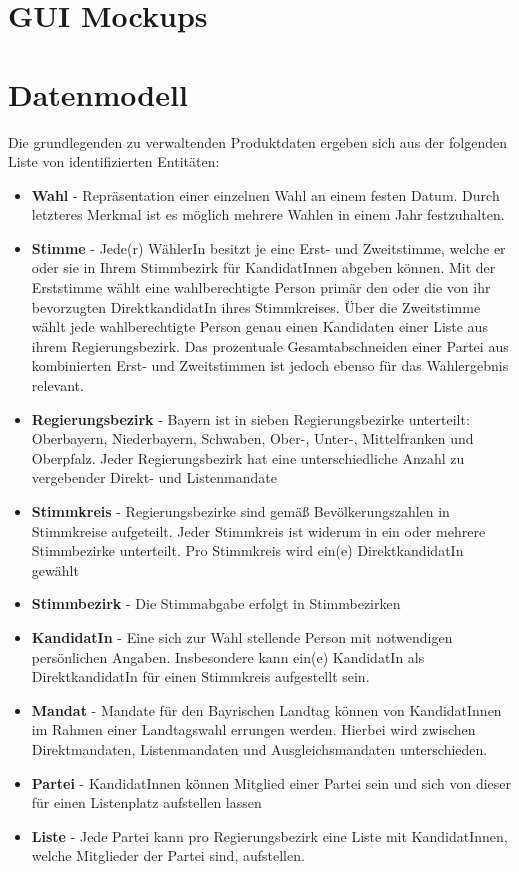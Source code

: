 \documentclass[a4paper,12pt]{article}
\begin{document}
\section{GUI Mockups}

\section{Datenmodell}
Die grundlegenden zu verwaltenden Produktdaten ergeben sich aus der folgenden Liste von
identifizierten Entitäten:
\begin{itemize}
  \item \textbf{Wahl} - Repräsentation einer einzelnen Wahl an einem festen Datum. 
        Durch letzteres Merkmal ist es möglich mehrere Wahlen in einem Jahr festzuhalten.
  \item \textbf{Stimme} - Jede(r) WählerIn besitzt je eine Erst- und Zweitstimme, welche er oder sie in Ihrem
        Stimmbezirk für KandidatInnen abgeben können. Mit der Erststimme wählt eine wahlberechtigte Person
        primär den oder die von ihr bevorzugten DirektkandidatIn ihres Stimmkreises. Über die Zweitstimme wählt 
        jede wahlberechtigte Person genau einen Kandidaten einer Liste aus ihrem Regierungsbezirk. Das prozentuale
        Gesamtabschneiden einer Partei aus kombinierten Erst- und Zweitstimmen ist jedoch ebenso für das 
        Wahlergebnis relevant.
  \item \textbf{Regierungsbezirk} - Bayern ist in sieben Regierungsbezirke unterteilt: Oberbayern,
        Niederbayern, Schwaben, Ober-, Unter-, Mittelfranken und Oberpfalz. Jeder Regierungsbezirk
        hat eine unterschiedliche Anzahl zu vergebender Direkt- und Listenmandate
  \item \textbf{Stimmkreis} - Regierungsbezirke sind gemäß Bevölkerungszahlen in Stimmkreise aufgeteilt.
        Jeder Stimmkreis ist widerum in ein oder mehrere Stimmbezirke unterteilt. Pro Stimmkreis wird ein(e)
        DirektkandidatIn gewählt
  \item \textbf{Stimmbezirk} - Die Stimmabgabe erfolgt in Stimmbezirken
  \item \textbf{KandidatIn} - Eine sich zur Wahl stellende Person mit notwendigen persönlichen Angaben. 
        Insbesondere kann ein(e) KandidatIn als DirektkandidatIn für einen Stimmkreis aufgestellt sein.
  \item \textbf{Mandat} - Mandate für den Bayrischen Landtag können von KandidatInnen im Rahmen einer Landtagswahl
        errungen werden. Hierbei wird zwischen Direktmandaten, Listenmandaten und Ausgleichsmandaten unterschieden.
  \item \textbf{Partei} - KandidatInnen können Mitglied einer Partei sein und sich von dieser für einen Listenplatz
        aufstellen lassen
  \item \textbf{Liste} - Jede Partei kann pro Regierungsbezirk eine Liste mit KandidatInnen, welche Mitglieder der 
        Partei sind, aufstellen.
\end{itemize}
\end{document}
